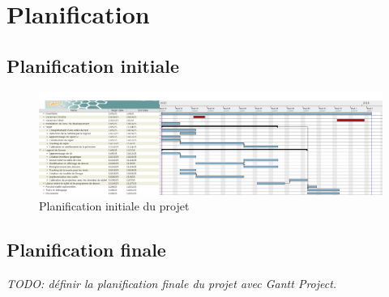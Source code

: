 \documentclass[11pt,a4paper,oldfontcommands]{memoir}
\begin{document}
\chapter{Planification}

\section{Planification initiale}

\begin{figure}[H]
\centering
\includegraphics[angle=90, scale=0.35]{images/planification.png}
\caption{Planification initiale du projet}
\end{figure}

\newpage

\section{Planification finale}

\textit{TODO: définir la planification finale du projet avec Gantt Project.}
\end{document}
